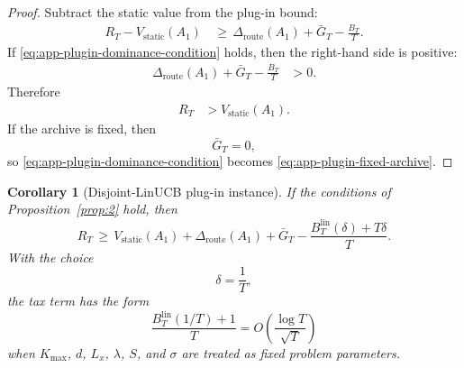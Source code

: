 \documentclass{article} %
\newtheorem{corollary}[theorem]{Corollary}
\begin{document}
\begin{proof}
Subtract the static value from the plug-in bound:
\begin{align}
\label{eq:app-plugin-dominance-proof}
R_T
-
V_{\mathrm{static}}(A_1)
&\,\ge\,
\Delta_{\mathrm{route}}(A_1)
+
\bar G_T
-
\frac{B_T}{T}.
\end{align}
If \eqref{eq:app-plugin-dominance-condition} holds, then the right-hand side is positive:
\begin{align}
\label{eq:app-plugin-dominance-proof-positive}
\Delta_{\mathrm{route}}(A_1)
+
\bar G_T
-
\frac{B_T}{T}
&>
0.
\end{align}
Therefore
\begin{align}
\label{eq:app-plugin-dominance-proof-final}
R_T
&>
V_{\mathrm{static}}(A_1).
\end{align}
If the archive is fixed, then
\begin{equation}
\label{eq:app-plugin-no-discovery}
\bar G_T=0,
\end{equation}
so \eqref{eq:app-plugin-dominance-condition} becomes \eqref{eq:app-plugin-fixed-archive}.
\end{proof}

\begin{corollary}[Disjoint-LinUCB plug-in instance]
\label{cor:app-linucb-plugin}
If the conditions of Proposition~\ref{prop:2} hold, then
\begin{equation}
\label{eq:app-linucb-plugin-bound}
R_T
\,\ge\,
V_{\mathrm{static}}(A_1)
+
\Delta_{\mathrm{route}}(A_1)
+
\bar G_T
-
\frac{B_T^{\mathrm{lin}}(\delta)+T\delta}{T}.
\end{equation}
With the choice
\begin{equation}
\label{eq:app-linucb-delta-choice}
\delta
=
\frac{1}{T},
\end{equation}
the tax term has the form
\begin{equation}
\label{eq:app-linucb-rate-form}
\frac{B_T^{\mathrm{lin}}(1/T)+1}{T}
=
O\!\left(\frac{\log T}{\sqrt T}\right)
\end{equation}
when \(K_{\max}\), \(d\), \(L_x\), \(\lambda\), \(S\), and \(\sigma\) are treated as fixed problem parameters.
\end{corollary}
\end{document}
